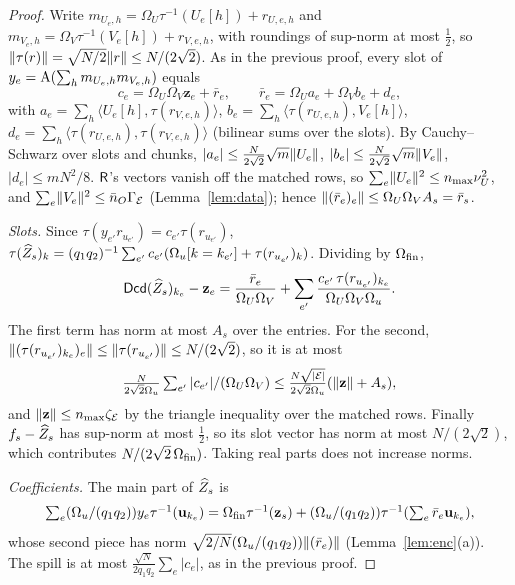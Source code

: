 \begin{proof}
Write $m_{U_e,h}=\Omega_U\tau^{-1}(U_e[h])+r_{U,e,h}$ and $m_{V_e,h}=\Omega_V\tau^{-1}(V_e[h])+r_{V,e,h}$, with roundings of sup-norm at most $\tfrac12$, so $\lVert \tau(r)\rVert=\sqrt{N/2}\lVert r\rVert\le N/(2\sqrt2)$. As in the previous proof, every slot of $y_e=\mathrm{A}(\sum_hm_{U_e,h}m_{V_e,h})$ equals
\[
  c_e=\Omega_U\Omega_V\mathbf z_e+\bar r_e,\qquad \bar r_e=\Omega_Ua_e+\Omega_Vb_e+d_e,
\]
with $a_e=\sum_h\langle U_e[h],\tau(r_{V,e,h})\rangle$, $b_e=\sum_h\langle\tau(r_{U,e,h}),V_e[h]\rangle$, $d_e=\sum_h\langle\tau(r_{U,e,h}),\tau(r_{V,e,h})\rangle$ (bilinear sums over the slots). By Cauchy--Schwarz over slots and chunks, $|a_e|\le\tfrac N{2\sqrt2}\sqrt m\lVert U_e\rVert$, $|b_e|\le\tfrac N{2\sqrt2}\sqrt m\lVert V_e\rVert$, $|d_e|\le mN^2/8$. $\mathsf{R}$'s vectors vanish off the matched rows, so $\sum_e\lVert U_e\rVert^2\le n_{\max}\nu_U^2$, and $\sum_e\lVert V_e\rVert^2\le\bar n_O\Gamma_{\mathcal E}$ (Lemma~\ref{lem:data}); hence $\lVert (\bar r_e)_e\rVert\le\Omega_U\Omega_VA_s=\bar r_s$.

\emph{Slots.} Since $\tau(y_{e'}r_{u_{e'}})=c_{e'}\tau(r_{u_{e'}})$, $\tau(\widehat Z_s)_k=(q_1q_2)^{-1}\sum_{e'}c_{e'}(\Omega_u[k=k_{e'}]+\tau(r_{u_{e'}})_k)$. Dividing by $\Omega_{\mathrm{fin}}$,
\[
  \mathsf{Dcd}(\widehat Z_s)_{k_e}-\mathbf z_e=\frac{\bar r_e}{\Omega_U\Omega_V}+\sum_{e'}\frac{c_{e'}\,\tau(r_{u_{e'}})_{k_e}}{\Omega_U\Omega_V\Omega_u}.
\]
The first term has norm at most $A_s$ over the entries. For the second, $\lVert (\tau(r_{u_{e'}})_{k_e})_e\rVert\le\lVert \tau(r_{u_{e'}})\rVert\le N/(2\sqrt2)$, so it is at most\[\tfrac N{2\sqrt2\Omega_u}\textstyle\sum_{e'}|c_{e'}|/(\Omega_U\Omega_V)\le\tfrac{N\sqrt{|\mathcal E|}}{2\sqrt2\Omega_u}(\lVert \mathbf z\rVert+A_s),\] and $\lVert \mathbf z\rVert\le n_{\max}\zeta_{\mathcal E}$ by the triangle inequality over the matched rows. Finally $f_s-\widehat Z_s$ has sup-norm at most $\tfrac12$, so its slot vector has norm at most $N/(2\sqrt2)$, which contributes $N/(2\sqrt2\,\Omega_{\mathrm{fin}})$. Taking real parts does not increase norms.

\emph{Coefficients.} The main part of $\widehat Z_s$ is\[\textstyle\sum_e(\Omega_u/(q_1q_2))y_e\tau^{-1}(\mathbf u_{k_e})=\Omega_{\mathrm{fin}}\tau^{-1}(\mathbf z_s)+(\Omega_u/(q_1q_2))\tau^{-1}(\sum_e\bar r_e\mathbf u_{k_e}),\]whose second piece has norm $\sqrt{2/N}(\Omega_u/(q_1q_2))\lVert (\bar r_e)\rVert$ (Lemma~\ref{lem:enc}(a)). The spill is at most $\tfrac{\sqrt N}{2q_1q_2}\sum_e|c_e|$, as in the previous proof.
\end{proof}

